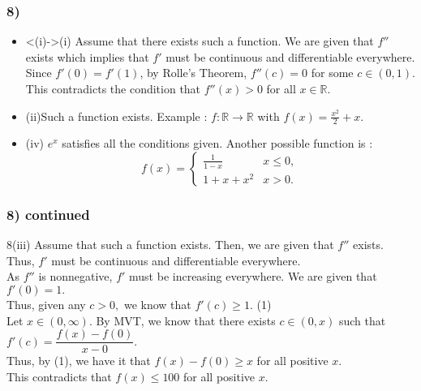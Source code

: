 \documentclass[handout]{beamer}
\begin{document}
\begin{frame}
\frametitle{8)}
    \begin{itemize}
      \item<(i)->(i) Assume that there exists such a function. We are given that $f''$ exists which implies that
                $f'$ must be continuous and differentiable everywhere.
                Since $f'(0) = f'(1)$, by Rolle's Theorem, $f''(c) = 0$ for some $c \in \left(0,1\right)$.
                This contradicts the condition that $f''(x) > 0$ for all $x \in \mathbb{R}$.
      \item<2-> (ii)Such a function exists. Example : $f:\mathbb{R} \rightarrow \mathbb{R}$ with $f(x) = \frac{x^{2}}{2}+x$.
      \item<3-> (iv) $e^{x}$ satisfies all the conditions given. Another possible function is :
      \begin{equation*} 
        f(x) = \begin{cases}
            \frac{1}{1-x} & x \le 0,\\
            1+x+x^{2} & x > 0.
        \end{cases}
    \end{equation*}

    \end{itemize}
\end{frame}

\begin{frame}
\frametitle{8) continued}
8(iii)
	Assume that such a function exists. Then, we are given that $f''$ exists. Thus, $f'$ must be continuous and differentiable everywhere.\\
	As $f''$ is nonnegative, $f'$ must be increasing everywhere. We are given that $f'(0) = 1.$ \\
	Thus, given any $c > 0,$ we know that $f'(c) \ge 1.$ \hfill (1)\\
	Let $x \in (0, \infty).$ By MVT, we know that there exists $c \in (0, x)$ such that $f'(c) = \dfrac{f(x) - f(0)}{x - 0}.$ \\ Thus, by (1), we have it that $f(x) - f(0) \ge x$ for all positive $x.$ \\
	This contradicts that $f(x) \le 100$ for all positive $x.$ 
\end{frame}
\end{document}
